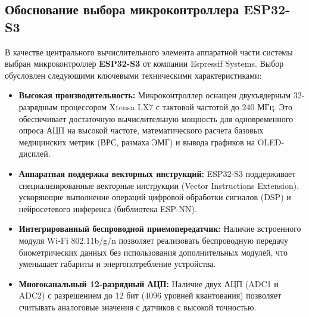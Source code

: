 \documentclass[utf8, russian]{eskdtext}
\begin{document}
\subsection{Обоснование выбора микроконтроллера ESP32-S3}
В качестве центрального вычислительного элемента аппаратной части системы выбран микроконтроллер \textbf{ESP32-S3} от компании Espressif Systems. Выбор обусловлен следующими ключевыми техническими характеристиками:
\begin{itemize}
    \item \textbf{Высокая производительность:} Микроконтроллер оснащен двухъядерным 32-разрядным процессором Xtensa LX7 с тактовой частотой до 240 МГц. Это обеспечивает достаточную вычислительную мощность для одновременного опроса АЦП на высокой частоте, математического расчета базовых медицинских метрик (ВРС, размаха ЭМГ) и вывода графиков на OLED-дисплей.
    \item \textbf{Аппаратная поддержка векторных инструкций:} ESP32-S3 поддерживает специализированные векторные инструкции (Vector Instructions Extension), ускоряющие выполнение операций цифровой обработки сигналов (DSP) и нейросетевого инференса (библиотека ESP-NN).
    \item \textbf{Интегрированный беспроводной приемопередатчик:} Наличие встроенного модуля Wi-Fi 802.11b/g/n позволяет реализовать беспроводную передачу биометрических данных без использования дополнительных модулей, что уменьшает габариты и энергопотребление устройства.
    \item \textbf{Многоканальный 12-разрядный АЦП:} Наличие двух АЦП (ADC1 и ADC2) с разрешением до 12 бит (4096 уровней квантования) позволяет считывать аналоговые значения с датчиков с высокой точностью.
\end{itemize}
\end{document}
